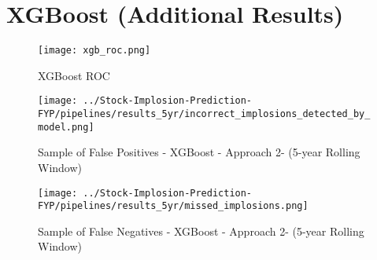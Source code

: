 \documentclass[a4paper]{report}
\begin{document}
\section*{XGBoost (Additional Results)}

\begin{figure}[h] %
  \centering
  \texttt{[image: xgb\_roc.png]} %
  \caption{XGBoost ROC}
  \label{fig:roc}
\end{figure}


\begin{figure}[h] %
  \centering
  \texttt{[image: ../Stock-Implosion-Prediction-FYP/pipelines/results\_5yr/incorrect\_implosions\_detected\_by\_model.png]} %
  \caption{Sample of False Positives - XGBoost - Approach 2- (5-year Rolling Window)}
  \label{fig:not_detected_implosions}
\end{figure}

\begin{figure}[h] %
  \centering
  \texttt{[image: ../Stock-Implosion-Prediction-FYP/pipelines/results\_5yr/missed\_implosions.png]} %
  \caption{Sample of False Negatives - XGBoost - Approach 2- (5-year Rolling Window)}
  \label{fig:missed_implosions}
\end{figure}

\end{document}

